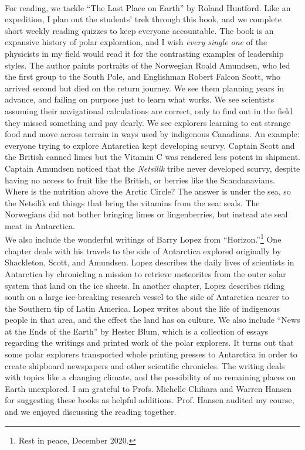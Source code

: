 \documentclass[../../../main.tex]{subfiles}
\begin{document}
\\
\vspace{0.25cm}
For reading, we tackle ``The Last Place on Earth'' by Roland Huntford.  Like an expedition, I plan out the students' trek through this book, and we complete short weekly reading quizzes to keep everyone accountable.  The book is an expansive history of polar exploration, and I wish \textit{every single one} of the physicists in my field would read it for the contrasting examples of leadership styles.  The author paints portraits of the Norwegian Roald Amundsen, who led the first group to the South Pole, and Englishman Robert Falcon Scott, who arrived second but died on the return journey.  We see them planning years in advance, and failing on purpose just to learn what works.  We see scientists assuming their navigational calculations are correct, only to find out in the field they missed something and pay dearly.  We see explorers learning to eat strange food and move across terrain in ways used by indigenous Canadians.  An example: everyone trying to explore Antarctica kept developing scurvy.  Captain Scott and the British canned limes but the Vitamin C was rendered less potent in shipment.  Captain Amundsen noticed that the \textit{Netsilik} tribe never developed scurvy, despite having no access to fruit like the British, or berries like the Scandanavians.  Where is the nutrition above the Arctic Circle?  The answer is under the sea, so the Netsilik eat things that bring the vitamins from the sea: seals.  The Norwegians did not bother bringing limes or lingenberries, but instead ate seal meat in Antarctica.
\\
\vspace{0.25cm}
We also include the wonderful writings of Barry Lopez from ``Horizon.''\footnote{Rest in peace, December 2020.}  One chapter deals with his travels to the side of Antarctica explored originally by Shackleton, Scott, and Amundsen.  Lopez describes the daily lives of scientists in Antarctica by chronicling a mission to retrieve meteorites from the outer solar system that land on the ice sheets.  In another chapter, Lopez describes riding south on a large ice-breaking research vessel to the side of Antarctica nearer to the Southern tip of Latin America.  Lopez writes about the life of indigenous people in that area, and the effect the land has on culture.  We also include ``News at the Ends of the Earth'' by Hester Blum, which is a collection of essays regarding the writings and printed work of the polar explorers.  It turns out that some polar explorers transported whole printing presses to Antarctica in order to create shipboard newspapers and other scientific chronicles.  The writing deals with topics like a changing climate, and the possibility of no remaining places on Earth unexplored.  I am grateful to Profs. Michelle Chihara and Warren Hansen for suggesting these books as helpful additions.  Prof. Hansen audited my course, and we enjoyed discussing the reading together.
\end{document}
